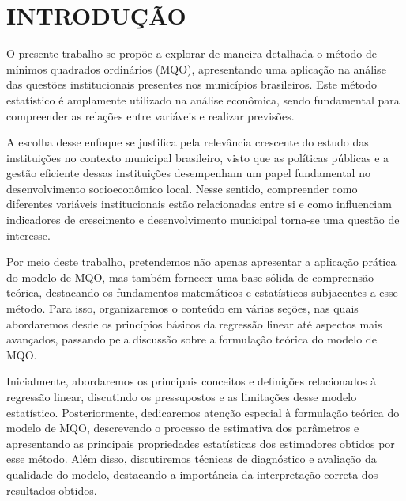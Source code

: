 \documentclass[a4paper,12pt]{article}
\renewcommand*\contentsname{Índice}
\newcommand\contentsname{Índice}
\begin{document}
\newpage
\renewcommand{\contentsname}{SUMÁRIO}
\pagestyle{fancy}
\tableofcontents

\newpage
{}\ifdefined\Shaded\renewenvironment{Shaded}{\begin{tcolorbox}[boxrule=0pt, frame hidden, sharp corners, interior hidden, breakable, borderline west={3pt}{0pt}{shadecolor}, enhanced]}{\end{tcolorbox}}\fi

\pagestyle{fancy} \justify \onehalfspacing

\hypertarget{introduuxe7uxe3o}{%
\section{INTRODUÇÃO}\label{introduuxe7uxe3o}}

O presente trabalho se propõe a explorar de maneira detalhada o método
de mínimos quadrados ordinários (MQO), apresentando uma aplicação na
análise das questões institucionais presentes nos municípios
brasileiros. Este método estatístico é amplamente utilizado na análise
econômica, sendo fundamental para compreender as relações entre
variáveis e realizar previsões.

A escolha desse enfoque se justifica pela relevância crescente do estudo
das instituições no contexto municipal brasileiro, visto que as
políticas públicas e a gestão eficiente dessas instituições desempenham
um papel fundamental no desenvolvimento socioeconômico local. Nesse
sentido, compreender como diferentes variáveis institucionais estão
relacionadas entre si e como influenciam indicadores de crescimento e
desenvolvimento municipal torna-se uma questão de interesse.

Por meio deste trabalho, pretendemos não apenas apresentar a aplicação
prática do modelo de MQO, mas também fornecer uma base sólida de
compreensão teórica, destacando os fundamentos matemáticos e
estatísticos subjacentes a esse método. Para isso, organizaremos o
conteúdo em várias seções, nas quais abordaremos desde os princípios
básicos da regressão linear até aspectos mais avançados, passando pela
discussão sobre a formulação teórica do modelo de MQO.

Inicialmente, abordaremos os principais conceitos e definições
relacionados à regressão linear, discutindo os pressupostos e as
limitações desse modelo estatístico. Posteriormente, dedicaremos atenção
especial à formulação teórica do modelo de MQO, descrevendo o processo
de estimativa dos parâmetros e apresentando as principais propriedades
estatísticas dos estimadores obtidos por esse método. Além disso,
discutiremos técnicas de diagnóstico e avaliação da qualidade do modelo,
destacando a importância da interpretação correta dos resultados
obtidos.
\end{document}
